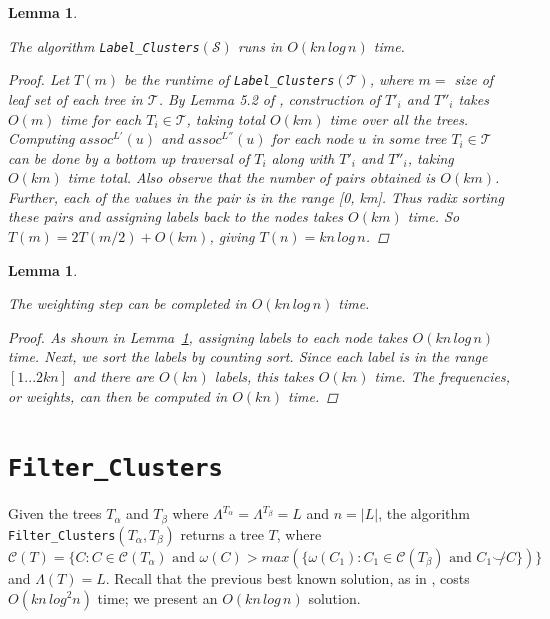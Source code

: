 \documentclass[12pt,a4paper]{article}
\newcommand{\compatible}{\smile}
\newcommand{\leafset}{\Lambda}
\newcommand{\weight}{\omega}
\newcommand{\TA}{T_\alpha}
\newcommand{\TB}{T_\beta}
\newtheorem{labelclustersruntime}[incompatibility]{Lemma}
\newtheorem{weightingruntime}[incompatibility]{Lemma}
\begin{document}
    \medskip
    \begin{labelclustersruntime}
        \label{lem:labelclustersruntime}

        The algorithm \texttt{Label\_Clusters}$(\mathcal{S})$ runs in $O(kn\,log\,n)$ time.

        \begin{proof}
            Let $T(m)$ be the runtime of \texttt{Label\_Clusters}$(\mathcal{T})$, where $m =$ size of leaf set of each tree in $\mathcal{T}$. By Lemma 5.2 of \cite{farach1995fast}, construction of $T'_i$ and $T''_i$ takes $O(m)$ time for each $T_i \in \mathcal{T}$, taking total $O(km)$ time over all the trees. Computing $assoc^{L'}(u)$ and $assoc^{L''}(u)$ for each node $u$ in some tree $T_i \in \mathcal{T}$ can be done by a bottom up traversal of $T_i$ along with $T'_i$ and $T''_i$, taking $O(km)$ time total. Also observe that the number of pairs obtained is $O(km)$. Further, each of the values in the pair is in the range [0, km]. Thus radix sorting these pairs and assigning labels back to the nodes takes $O(km)$ time. So $T(m) = 2T(m/2) + O(km)$, giving $T(n) = kn\,log\,n$.
        \end{proof}
    \end{labelclustersruntime}

    \medskip
    \begin{weightingruntime}
        \label{lem:weightingruntime}

        The weighting step can be completed in $O(kn\,log\,n)$ time.

        \begin{proof}
            As shown in Lemma~\ref{lem:labelclustersruntime}, assigning labels to each node takes $O(kn\,log\,n)$ time. Next, we sort the labels by counting sort. Since each label is in the range $[1 ... 2kn]$ and there are $O(kn)$ labels, this takes $O(kn)$ time. The frequencies, or weights, can then be computed in $O(kn)$ time.
        \end{proof}
    \end{weightingruntime}

    \section{\texttt{Filter\_Clusters}}
    \label{sec:filterclusters}

    Given the trees $\TA$ and $\TB$ where $\leafset^{\TA} = \leafset^{\TB} = L$ and $n = |L|$, the algorithm \texttt{Filter\_Clusters}$(\TA, \TB)$ returns a tree $T$, where $\mathcal{C}(T) = \{C : C \in \mathcal{C}(\TA) \text{ and } \weight(C) > max(\{\weight(C_1) : C_1 \in \mathcal{C}(\TB) \text{ and } C_1 \not\compatible C\})\}$ and $\leafset(T) = L$. Recall that the previous best known solution, as in \cite{jansson2018algorithms}, costs $O(kn\,log^2n)$ time; we present an $O(kn\,log\,n)$ solution.
\end{document}
